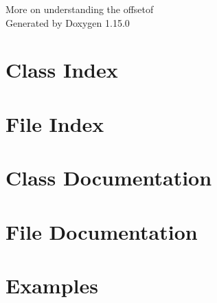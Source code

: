\documentclass[twoside]{book}
\newcommand{\+}{\discretionary{\mbox{\scriptsize$\hookleftarrow$}}{}{}}
\newcommand{\clearemptydoublepage}{%
    \newpage{\pagestyle{empty}\cleardoublepage}%
  }
\begin{document}
  \raggedbottom
    \hypersetup{pageanchor=false,
                bookmarksnumbered=true,
                pdfencoding=unicode
               }
  \begin{titlepage}
  \vspace*{7cm}
  \begin{center}%
  {\Large More on understanding the offsetof}\\
  \vspace*{1cm}
  {\large Generated by Doxygen 1.15.0}\\
  \end{center}
  \end{titlepage}
  \clearemptydoublepage
  \tableofcontents
  \clearemptydoublepage
  \hypersetup{pageanchor=true}
\chapter{Class Index}

\chapter{File Index}

\chapter{Class Documentation}



\chapter{File Documentation}




\chapter{Examples}


  \backmatter
  \newpage
  \clearemptydoublepage
  \printindex
\end{document}
